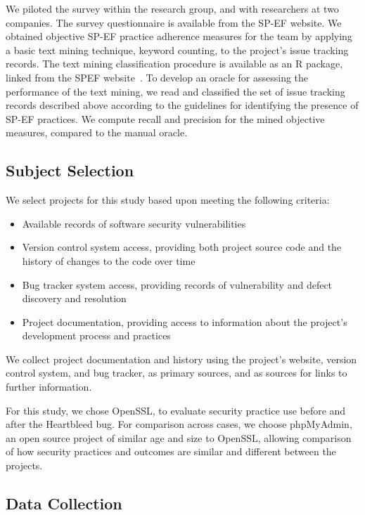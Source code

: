 We piloted the survey within the research group, and with researchers at two companies. The survey questionnaire is available from the SP-EF website. We obtained objective SP-EF practice adherence measures for the team by applying a basic text mining technique, keyword counting, to the project's issue tracking records. The text mining classification procedure is available as an R package, linked from the SPEF website~\cite{morrison2016spef}.   To develop an oracle for assessing the performance of the text mining, we read and classified the set of issue tracking records described above according to the guidelines for identifying the presence of SP-EF practices. We compute recall and precision for the mined objective measures, compared to the manual oracle. 

\subsection{Subject Selection}
We select projects for this study based upon meeting the following criteria:
\begin{itemize}
	
	\item Available records of software security vulnerabilities
	\item Version control system access, providing both project source code and the history of changes to the code over time
	\item Bug tracker system access, providing records of vulnerability and defect discovery and resolution
	\item Project documentation, providing access to information about the project’s development process and practices
\end{itemize}

We collect project documentation and history using the project’s website, version control system, and bug tracker, as primary sources, and as sources for links to further information. 

For this study, we chose OpenSSL, to evaluate security practice use before and after the Heartbleed bug.  For comparison across cases, we choose phpMyAdmin, an open source project of similar age and size to OpenSSL, allowing comparison of how security practices and outcomes are similar and different between the projects. 

\subsection{Data Collection}

